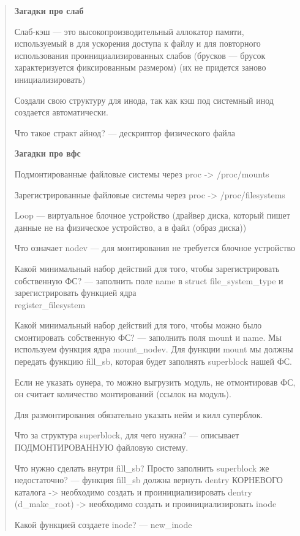\begin{quote}
	\textbf{Загадки про слаб}

	Слаб-кэш --- это высокопроизводительный аллокатор памяти, используемый в для ускорения доступа к файлу и для повторного использования проинициализированных слабов (брусков --- брусок характеризуется фиксированным размером) (их не придется заново инициализировать)
	
	Создали свою структуру для инода, так как кэш под системный инод создается автоматически.
	
	Что такое стракт айнод? --- дескриптор физического файла
	
	\textbf{Загадки про вфс}
	
	Подмонтированные файловые системы через proc -> /proc/mounts

Зарегистрированные файловые системы через proc -> /proc/filesystems

Loop --- виртуальное блочное устройство (драйвер диска, который пишет данные не на физическое устройство, а в файл (образ диска))

Что означает nodev --- для монтирования не требуется блочное устройство

Какой минимальный набор действий для того, чтобы зарегистрировать собственную ФС? --- заполнить поле name в struct file\_system\_type и зарегистрировать функцией ядра \\ register\_filesystem
    
Какой минимальный набор действий для того, чтобы можно было смонтировать
   собственную ФС? --- заполнить поля mount и name. Мы используем функция ядра mount\_nodev. Для функции mount мы должны передать функцию fill\_sb, которая будет заполнять superblock нашей ФС.
   
Если не указать оунера, то можно выгрузить модуль, не отмонтировав ФС, он считает количество монтирований (ссылок на модуль).

Для размонтирования обязательно указать нейм и килл суперблок.
   
Что за структура superblock, для чего нужна? --- описывает ПОДМОНТИРОВАННУЮ файловую систему.

Что нужно сделать внутри fill\_sb? Просто заполнить superblock же недостаточно? --- функция fill\_sb должна вернуть dentry КОРНЕВОГО каталога -> необходимо создать и проинициализировать dentry (d\_make\_root) -> необходимо создать и проинициализировать inode

Какой функцией создаете inode? --- new\_inode


\end{quote}
